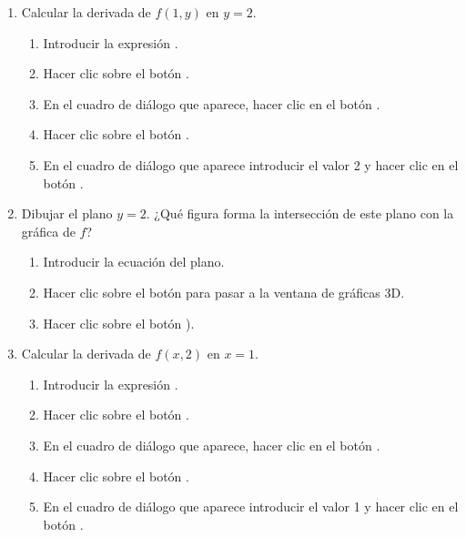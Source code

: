 \begin{enumerate}[leftmargin=*]
\begin{enumerate}
\item Calcular la derivada de $f(1,y)$ en $y=2$.
\begin{indicacion}
\begin{enumerate}
\item Introducir la expresión .
\item Hacer clic sobre el botón .
\item En el cuadro de diálogo que aparece, hacer clic en el botón .
\item Hacer clic sobre el botón .
\item En el cuadro de diálogo que aparece introducir el valor 2 y hacer clic en el botón .
\end{enumerate}
\end{indicacion}

\item Dibujar el plano $y=2$. ¿Qué figura forma la intersección de este plano con la gráfica de $f$?
\begin{indicacion}
\begin{enumerate}
\item Introducir la ecuación del plano.
\item Hacer clic sobre el botón  para pasar a la ventana de gráficas 3D.
\item Hacer clic sobre el botón ).
\end{enumerate}
\end{indicacion}

\item Calcular la derivada de $f(x,2)$ en $x=1$.
\begin{indicacion}
\begin{enumerate}
\item Introducir la expresión .
\item Hacer clic sobre el botón .
\item En el cuadro de diálogo que aparece, hacer clic en el botón .
\item Hacer clic sobre el botón .
\item En el cuadro de diálogo que aparece introducir el valor 1 y hacer clic en el botón .
\end{enumerate}
\end{indicacion}


\end{enumerate}
\end{enumerate}
